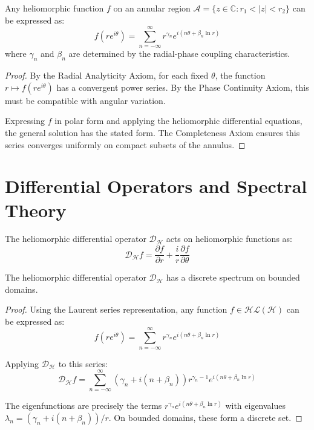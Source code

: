 \begin{theorem}
Any heliomorphic function $f$ on an annular region $\mathcal{A} = \{z \in \mathbb{C} : r_1 < |z| < r_2\}$ can be expressed as:
\begin{equation}
f(re^{i\theta}) = \sum_{n=-\infty}^{\infty} r^{\gamma_n} e^{i(n\theta + \beta_n \ln r)}
\end{equation}
where $\gamma_n$ and $\beta_n$ are determined by the radial-phase coupling characteristics.
\end{theorem}

\begin{proof}
By the Radial Analyticity Axiom, for each fixed $\theta$, the function $r \mapsto f(re^{i\theta})$ has a convergent power series. By the Phase Continuity Axiom, this must be compatible with angular variation.

Expressing $f$ in polar form and applying the heliomorphic differential equations, the general solution has the stated form. The Completeness Axiom ensures this series converges uniformly on compact subsets of the annulus.
\end{proof}

\section{Differential Operators and Spectral Theory}

\begin{definition}
The heliomorphic differential operator $\mathcal{D}_{\mathcal{H}}$ acts on heliomorphic functions as:
\begin{equation}
\mathcal{D}_{\mathcal{H}}f = \frac{\partial f}{\partial r} + \frac{i}{r}\frac{\partial f}{\partial \theta}
\end{equation}
\end{definition}

\begin{theorem}
The heliomorphic differential operator $\mathcal{D}_{\mathcal{H}}$ has a discrete spectrum on bounded domains.
\end{theorem}

\begin{proof}
Using the Laurent series representation, any function $f \in \mathcal{HL}(\mathcal{H})$ can be expressed as:
\begin{equation}
f(re^{i\theta}) = \sum_{n=-\infty}^{\infty} r^{\gamma_n} e^{i(n\theta + \beta_n \ln r)}
\end{equation}

Applying $\mathcal{D}_{\mathcal{H}}$ to this series:
\begin{equation}
\mathcal{D}_{\mathcal{H}}f = \sum_{n=-\infty}^{\infty} (\gamma_n + i(n + \beta_n))r^{\gamma_n-1} e^{i(n\theta + \beta_n \ln r)}
\end{equation}

The eigenfunctions are precisely the terms $r^{\gamma_n} e^{i(n\theta + \beta_n \ln r)}$ with eigenvalues $\lambda_n = (\gamma_n + i(n + \beta_n))/r$. On bounded domains, these form a discrete set.
\end{proof}

